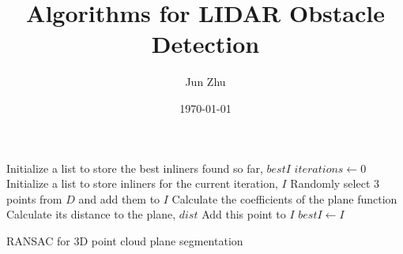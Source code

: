 \documentclass[12pt]{article}
\title{Algorithms for LIDAR Obstacle Detection}
\author{Jun Zhu}
\date{\today}
\begin{document}
\maketitle


\begin{algorithm}[H]
\DontPrintSemicolon
\SetAlgoLined
{}


\BlankLine

Initialize a list to store the best inliners found so far, $bestI$\;
$iterations \leftarrow 0$\;
 {
	  Initialize a list to store inliners for the current iteration,  $I$\;
    Randomly select 3 points from $D$ and add them to $I$\;
    Calculate the coefficients of the plane function\;
		 {
				Calculate its distance to the plane, $dist$\;
				 {
						Add this point to $I$\;
				}
		}
		 {
				$bestI \leftarrow I$\;
		}
}
\caption{RANSAC for 3D point cloud plane segmentation}
\end{algorithm} 


\newpage
\end{document}
